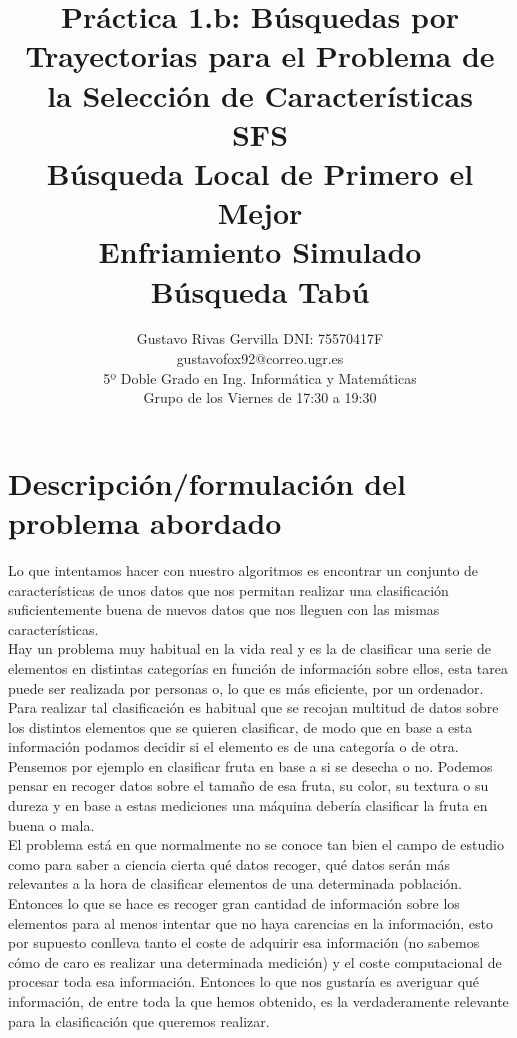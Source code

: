 \documentclass[10pt,a4paper]{article}
\author{Gustavo Rivas Gervilla DNI: 75570417F \\ gustavofox92@correo.ugr.es \\5º Doble Grado en Ing. Informática y Matemáticas \\Grupo de los Viernes de 17:30 a 19:30}
\title{Práctica 1.b: Búsquedas por Trayectorias para el Problema de la Selección de Características \\ SFS \\ Búsqueda Local de Primero el Mejor \\ Enfriamiento Simulado \\ Búsqueda Tabú}
\date{}
\begin{document}
\lstset{language=Python, style=customPy}
\maketitle

\newpage

\tableofcontents

\newpage

\section{\color[rgb]{0.0,0.0,0.21}Descripción/formulación del problema abordado}
Lo que intentamos hacer con nuestro algoritmos es encontrar un conjunto de características de unos datos que nos permitan realizar una clasificación suficientemente buena de nuevos datos que nos lleguen con las mismas características.\\

Hay un problema muy habitual en la vida real y es la de clasificar una serie de elementos en distintas categorías en función de información sobre ellos, esta tarea puede ser realizada por personas o, lo que es más eficiente, por un ordenador. Para realizar tal clasificación es habitual que se recojan multitud de datos sobre los distintos elementos que se quieren clasificar, de modo que en base a esta información podamos decidir si el elemento es de una categoría o de otra. Pensemos por ejemplo en clasificar fruta en base a si se desecha o no. Podemos pensar en recoger datos sobre el tamaño de esa fruta, su color, su textura o su dureza y en base a estas mediciones una máquina debería clasificar la fruta en buena o mala.\\

El problema está en que normalmente no se conoce tan bien el campo de estudio como para saber a ciencia cierta qué datos recoger, qué datos serán más relevantes a la hora de clasificar elementos de una determinada población. Entonces lo que se hace es recoger gran cantidad de información sobre los elementos para al menos intentar que no haya carencias en la información, esto por supuesto conlleva tanto el coste de adquirir esa información (no sabemos cómo de caro es realizar una determinada medición) y el coste computacional de procesar toda esa información. Entonces lo que nos gustaría es averiguar qué información, de entre toda la que hemos obtenido, es la verdaderamente relevante para la clasificación que queremos realizar.\\
\end{document}
